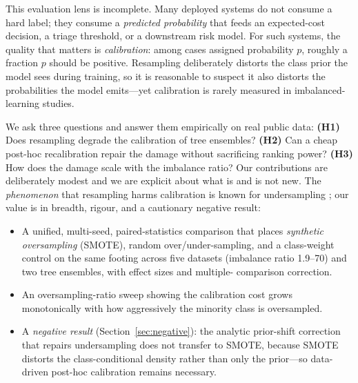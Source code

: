 \documentclass[conference]{IEEEtran}
\begin{document}
This evaluation lens is incomplete. Many deployed systems do not consume
a hard label; they consume a \emph{predicted probability} that feeds an
expected-cost decision, a triage threshold, or a downstream risk model.
For such systems, the quality that matters is \emph{calibration}: among
cases assigned probability $p$, roughly a fraction $p$ should be
positive. Resampling deliberately distorts the class prior the model
sees during training, so it is reasonable to suspect it also distorts the
probabilities the model emits---yet calibration is rarely measured in
imbalanced-learning studies.

We ask three questions and answer them empirically on real public data:
\textbf{(H1)} Does resampling degrade the calibration of tree ensembles?
\textbf{(H2)} Can a cheap post-hoc recalibration repair the damage
without sacrificing ranking power? \textbf{(H3)} How does the damage
scale with the imbalance ratio? Our contributions are deliberately modest
and we are explicit about what is and is not new. The \emph{phenomenon}
that resampling harms calibration is known for undersampling
\cite{dalpozzolo2015calibrating}; our value is in breadth, rigour, and a
cautionary negative result:
\begin{itemize}
\item A unified, multi-seed, paired-statistics comparison that places
\emph{synthetic oversampling} (SMOTE), random over/under-sampling, and a
class-weight control on the same footing across five datasets (imbalance
ratio 1.9--70) and two tree ensembles, with effect sizes and multiple-
comparison correction.
\item An oversampling-ratio sweep showing the calibration cost grows
monotonically with how aggressively the minority class is oversampled.
\item A \emph{negative result} (Section~\ref{sec:negative}): the analytic
prior-shift correction that repairs undersampling does not transfer to
SMOTE, because SMOTE distorts the class-conditional density rather than
only the prior---so data-driven post-hoc calibration remains necessary.
\end{itemize}
\end{document}
